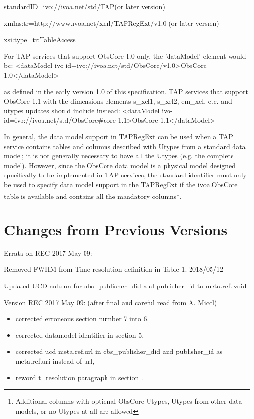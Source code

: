 \documentclass[11pt,a4paper]{ivoa}
\begin{document}
standardID={\textquotedbl}ivo://ivoa.net/std/TAP{\textquotedbl}(or later version)

xmlns:tr={\textquotedbl}http://www.ivoa.net/xml/TAPRegExt/v1.0{\textquotedbl} (or later version) 

xsi:type={\textquotedbl}tr:TableAccess{\textquotedbl}

For TAP services that support ObsCore-1.0 only, the {}'dataModel' element would be:   {\textless}dataModel
ivo-id={\textquotedbl}ivo://ivoa.net/std/ObsCore/v1.0{\textquotedbl}{\textgreater}ObsCore-1.0{\textless}/dataModel{\textgreater}


as defined in the early version 1.0 of this specification.  TAP services that support ObsCore-1.1 with the dimensions
elements s\_xel1, s\_xel2, em\_xel, etc. and utypes updates should include instead:  {\textless}dataModel
ivo-id={\textquotedbl}ivo://ivoa.net/std/ObsCore\#core-1.1{\textquotedbl}{\textgreater}ObsCore-1.1{\textless}/dataModel{\textgreater}


In general, the data model support in TAPRegExt can be used when a TAP service contains tables and columns described
with Utypes from a standard data model; it is not generally necessary to have all the Utypes (e.g. the complete model).
However, since the ObsCore data model is a physical model designed specifically to be implemented in TAP services, the
standard identifier must only be used to specify data model support in the TAPRegExt if the ivoa.ObsCore table is
available and contains all the mandatory columns\footnote{ Additional columns with optional ObsCore Utypes, Utypes from
other data models, or no Utypes at all are allowed}.


\section{Changes from Previous Versions}
Errata on REC 2017 May 09:

Removed FWHM from Time resolution definition in Table 1. 2018/05/12

Updated UCD column for obs\_publisher\_did and publisher\_id to meta.ref.ivoid

Version REC 2017 May 09: (after final and careful read from A. Micol)

\begin{itemize}
\item corrected erroneous section number 7 into 6, 
\item corrected  datamodel identifier in section 5,
\item corrected ucd meta.ref.url in obs\_publisher\_did and publisher\_id  as meta.ref.uri instead of url,
\item reword t\_resolution paragraph in section .
\end{itemize}
\end{document}
